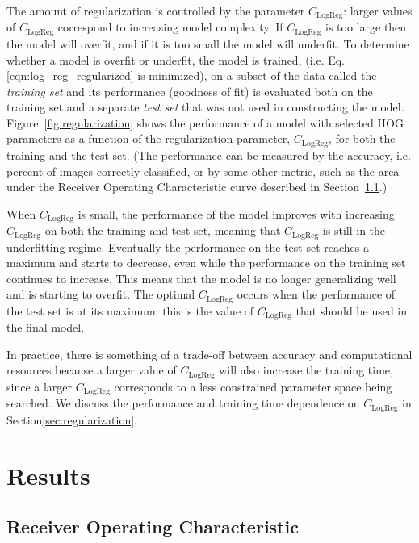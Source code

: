 \documentclass{emulateapj}
\begin{document}
The amount of regularization is controlled by the parameter
$C_\text{LogReg}$: larger values of $C_\text{LogReg}$ correspond to
increasing model complexity.  If $C_\text{LogReg}$ is too large then
the model will overfit, and if it is too small the model will
underfit.  To determine whether a model is overfit or underfit, the
model is trained, (i.e. Eq. \ref{eqn:log_reg_regularized} is
minimized), on a subset of the data called the {\em{training set}} and
its performance (goodness of fit) is evaluated both on the
training set and a separate {\em{test set}}
that was not used in constructing the model.
Figure~\ref{fig:regularization} shows the performance of a model with
selected HOG parameters as a function of the regularization parameter,
$C_\text{LogReg}$, for both the training and the test set.  (The
performance can be measured by the accuracy, i.e. percent of images
correctly classified, or by some other metric, such as the area under
the Receiver Operating Characteristic curve described in
Section~\ref{sec:ROC}.)

When $C_\text{LogReg}$ is small, the performance of the model improves
with increasing $C_\text{LogReg}$ on both the training and test set,
meaning that $C_\text{LogReg}$ is
still in the underfitting regime. Eventually the performance on the
test set reaches a maximum and starts to decrease, even while the
performance on the training set continues to increase.  This means
that the model is no longer generalizing well and is starting to
overfit. The optimal $C_\text{LogReg}$ occurs when the performance
of the test set is at its maximum; this is the value of $C_\text{LogReg}$
that should be used in the final model.

In practice, there is something of a trade-off between accuracy and
computational resources because a larger value of $C_\text{LogReg}$
will also increase the training time, since a larger $C_\text{LogReg}$
corresponds to a less constrained parameter space being searched.
We discuss the performance and training time dependence on $C_\text{LogReg}$
in Section\ref{sec:regularization}.

\section{Results}
\label{sec:results}

\subsection{Receiver Operating Characteristic}\label{sec:ROC}
\end{document}
